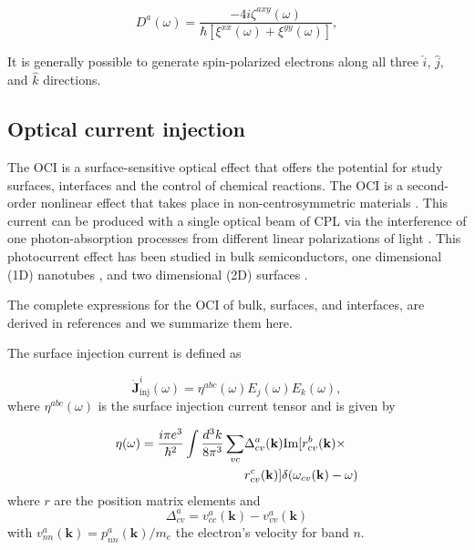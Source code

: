 \documentclass[pss]{wiley2sp} %
\begin{document}
\begin{equation}\label{eq:D^i}
D^{a}(\omega) = 
\frac{-4i\zeta^{axy}(\omega)}
    {\hbar\left[\xi^{xx}(\omega) + \xi^{yy}(\omega)\right]},
\end{equation}
\begin{changed}
\end{changed} 

It is generally possible to generate spin-polarized electrons along all three
$\hat{i}$, $\hat{j}$, and $\hat{k}$ directions. 



\begin{changed}
\subsection{Optical current injection}
The OCI is a surface-sensitive optical effect that offers the potential for study surfaces, interfaces and the control of chemical reactions. The OCI is a second-order nonlinear effect that takes place in non-centrosymmetric materials \cite{nastos2006optical,cabellos2011optical,bhat2005excitonic,fraser1999quantum}. This current can be produced with a single optical beam of CPL via the interference of one photon-absorption processes from different linear polarizations of light \cite{sipe2000second}. This photocurrent effect has been studied in bulk semiconductors, one dimensional (1D) nanotubes \cite{mele2000coherent,kral2000photogalvanic}, and two dimensional (2D) surfaces \cite{mele2000coherent}.

The complete expressions for the OCI of bulk, surfaces, and interfaces, are derived in references \cite{cabellos2011optical,sipe2000second} and we summarize them here. 

The surface injection current is defined as

\begin{equation}
\mathbf{\dot{J}}^{i}_{\text{inj}}(\omega) =
\eta^{abc}(\omega)E_{j}(\omega)E_{k}(\omega), \label{eq:eta}
\end{equation}
where $\eta^{abc}(\omega)$ is the surface injection current tensor and is given by

\begin{align*}
\eta(\omega) =  \frac{i\pi e^{3}}{\hbar^{2}}\int\frac{d^{3}k}{8\pi^{3}}\sum_{vc}&
\Delta^{a}_{cv}(\mathbf{k})\text{Im}\large[r^{b}_{cv}(\mathbf{k})\times
\\ & r^{c}_{cv}(\mathbf{k})\large]\delta(\omega_{cv}(\mathbf{k})-\omega)
\end{align*}
where $r$ are the position matrix elements and 
\begin{equation*}
\Delta^{a}_{cv} = v^{a}_{cc}(\mathbf{k})-v^{a}_{vv}(\mathbf{k})
\end{equation*}
with $v^{a}_{nn}(\mathbf{k})=p^{a}_{nn}(\mathbf{k})/m_{e}$ the electron’s velocity for band $n$.


\end{changed}
\end{document}
